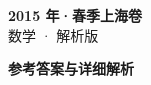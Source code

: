 \documentclass[zihao=-4, a4paper]{ctexart}
\begin{document}
\begin{center}
  {\Large\bfseries 2015 年·春季上海卷}\\[4pt]
  {\large 数学 · 解析版}
\end{center}
\medskip
{}

\clearpage
{}
\begin{center}{\Large\bfseries 参考答案与详细解析}\end{center}
\medskip

\end{document}
